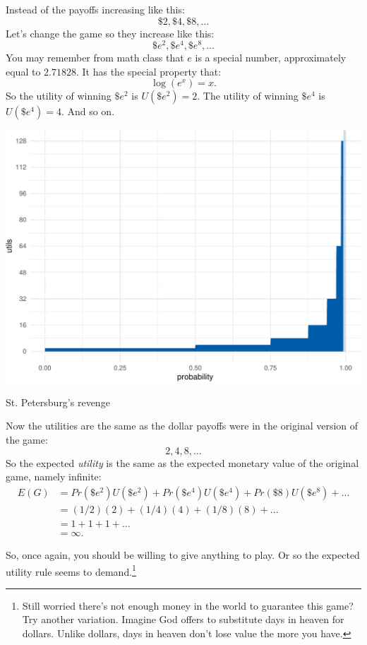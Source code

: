 \documentclass[justified]{tufte-book}
\renewcommand{\u}{U}
\newcommand{\p}{Pr}
\newcommand{\E}{E}
\theoremstyle{definition}
\theoremstyle{definition}
\theoremstyle{definition}
\theoremstyle{remark}
\begin{document}
Instead of the payoffs increasing like this:
\[ \$2, \$4, \$8, \ldots \]
Let's change the game so they increase like this:
\[ \$e^2, \$e^4, \$e^8, \ldots \]
You may remember from math class that \(e\) is a special number, approximately equal to \(2.71828\). It has the special property that:
\[ \log(e^x) = x. \]
So the utility of winning \(\$e^2\) is \(\u(\$e^2) = 2\). The utility of winning \(\$e^4\) is \(\u(\$e^4) = 4\). And so on.

\begin{marginfigure}
\includegraphics{_main_files/figure-latex/expstp-1} \caption[St]{St. Petersburg's revenge}\label{fig:expstp}
\end{marginfigure}

Now the utilities are the same as the dollar payoffs were in the original version of the game:
\[ 2, 4, 8, \ldots \]
So the expected \emph{utility} is the same as the expected monetary value of the original game, namely infinite:
\[
  \begin{aligned}
     \E(G) &= \p(\$e^2) \u(\$e^2) + \p(\$e^4) \u(\$e^4) + \p(\$8) \u(\$e^8) + \ldots\\
          &= (1/2)(2) + (1/4)(4) + (1/8)(8) + \ldots\\
          &= 1 + 1 + 1 + \ldots\\
          &= \infty.
  \end{aligned}
\]

So, once again, you should be willing to give anything to play. Or so the expected utility rule seems to demand.\footnote{Still worried there's not enough money in the world to guarantee this game? Try another variation. Imagine God offers to substitute days in heaven for dollars. Unlike dollars, days in heaven don't lose value the more you have.}
\end{document}
